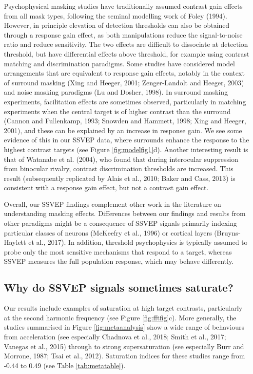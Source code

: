 \documentclass[]{article}
\begin{document}
Psychophysical masking studies have traditionally assumed contrast gain effects from all mask types, following the seminal modelling work of Foley (1994). However, in principle elevation of detection thresholds can also be obtained through a response gain effect, as both manipulations reduce the signal-to-noise ratio and reduce sensitivity. The two effects are difficult to dissociate at detection threshold, but have differential effects above threshold, for example using contrast matching and discrimination paradigms. Some studies have considered model arrangements that are equivalent to response gain effects, notably in the context of surround masking (Xing and Heeger, 2001; Zenger-Landolt and Heeger, 2003) and noise masking paradigms (Lu and Dosher, 1998). In surround masking experiments, facilitation effects are sometimes observed, particularly in matching experiments when the central target is of higher contrast than the surround (Cannon and Fullenkamp, 1993; Snowden and Hammett, 1998; Xing and Heeger, 2001), and these can be explained by an increase in response gain. We see some evidence of this in our SSVEP data, where surrounds enhance the response to the highest contrast targets (see Figure \ref{fig:modelfig1}d). Another interesting result is that of Watanabe et al. (2004), who found that during interocular suppression from binocular rivalry, contrast discrimination thresholds are increased. This result (subsequently replicated by Alais et al., 2010; Baker and Cass, 2013) is consistent with a response gain effect, but not a contrast gain effect.

Overall, our SSVEP findings complement other work in the literature on understanding masking effects. Differences between our findings and results from other paradigms might be a consequence of SSVEP signals primarily indexing particular classes of neurons (McKeefry et al., 1996) or cortical layers (Bruyns-Haylett et al., 2017). In addition, threshold psychophysics is typically assumed to probe only the most sensitive mechanisms that respond to a target, whereas SSVEP measures the full population response, which may behave differently.

\hypertarget{why-do-ssvep-signals-sometimes-saturate}{%
\subsection{Why do SSVEP signals sometimes saturate?}\label{why-do-ssvep-signals-sometimes-saturate}}

Our results include examples of saturation at high target contrasts, particularly at the second harmonic frequency (see Figure \ref{fig:fftfig}c). More generally, the studies summarised in Figure \ref{fig:metaanalysis} show a wide range of behaviours from acceleration (see especially Chadnova et al., 2018; Smith et al., 2017; Vanegas et al., 2015) through to strong supersaturation (see especially Burr and Morrone, 1987; Tsai et al., 2012). Saturation indices for these studies range from -0.44 to 0.49 (see Table \ref{tab:metatable}).
\end{document}
